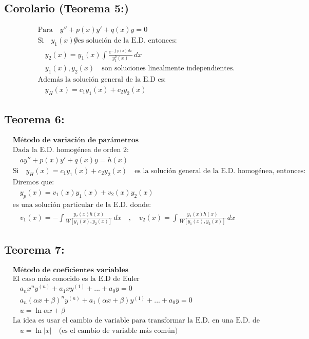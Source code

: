 \documentclass[a4paper,12pt,numbers=noenddot]{scrreprt}
\begin{document}
\subsection*{Corolario (Teorema 5:)}
\begin{align*}
    &\text{Para} \quad y'' + p(x)y' + q(x)y = 0 \\
    &\text{Si} \quad y_1(x) \not 0 \text{es solución de la E.D. entonces:}\\
    &\quad y_2(x) = y_1(x) \int \frac{e^{-\int p(x)\,dx}}{y_1^2(x)} \,dx\\
    &\quad {y_1(x), y_2(x)} \quad \text{son soluciones linealmente independientes.}\\
    &\text{Además la solución general de la E.D es:}\\
    &\quad y_H(x) = c_1y_1(x) + c_2y_2(x)
\end{align*}

\subsection*{Teorema 6:}
\begin{align*}
    &\textbf{Método de variación de parámetros}\\
    &\text{Dada la E.D. homogénea de orden 2:}\\
    &\quad a y'' + p(x) y' + q(x) y = h(x)\\
    &\text{Si} \quad y_H(x) = c_1y_1(x) + c_2y_2(x) \quad \text{es la solución general de la E.D. homogénea, entonces:}\\
    &\text{Diremos que:}\\
    &\quad y_p(x) = v_1(x)y_1(x) + v_2(x)y_2(x)\\
    &\text{es una solución particular de la E.D. donde:}\\
    &\quad v_1(x) = -\int \frac{y_2(x)h(x)}{W[y_1(x),y_2(x)]} \,dx \quad , \quad v_2(x) = \int \frac{y_1(x)h(x)}{W[y_1(x),y_2(x)]} \,dx
\end{align*}

\subsection*{Teorema 7:}
\begin{align*}
    &\textbf{Método de coeficientes variables}\\
    &\text{El caso más conocido es la E.D de Euler}\\
    &\quad a_n x^n y^{(n)} + a_{1} x y^{(1)} + ... + a_0 y = 0\\
    &\quad a_n(\alpha x + \beta)^n y^{(n)} + a_{1}(\alpha x + \beta) y^{(1)} + ... + a_0 y = 0\\
    &\quad u = \ln{\alpha x + \beta}\\
    &\text{La idea es usar el cambio de variable para transformar la E.D. en una E.D. de coeficientes constantes.}\\
    &\quad u= \ln |x| \quad \text{(es el cambio de variable más común)}
\end{align*} 
\end{document}
